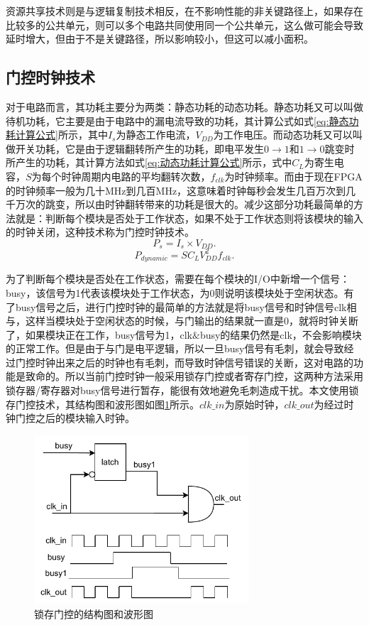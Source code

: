   资源共享技术则是与逻辑复制技术相反，在不影响性能的非关键路径上，如果存在比较多的公共单元，则可以多个电路共同使用同一个公共单元，这么做可能会导致延时增大，但由于不是关键路径，所以影响较小，但这可以减小面积。

\subsection{门控时钟技术}
对于电路而言，其功耗主要分为两类：静态功耗的动态功耗。静态功耗又可以叫做待机功耗，它主要是由于电路中的漏电流导致的功耗，其计算公式如式\eqref{eq:静态功耗计算公式}所示，其中$I_s$为静态工作电流，$V_{DD}$为工作电压。而动态功耗又可以叫做开关功耗，它是由于逻辑翻转所产生的功耗，即电平发生$0\rightarrow1$和$1\rightarrow0$跳变时所产生的功耗，其计算方法如式\eqref{eq:动态功耗计算公式}所示，式中$C_L$为寄生电容，$S$为每个时钟周期内电路的平均翻转次数，$f_{clk}$为时钟频率。而由于现在FPGA的时钟频率一般为几十MHz到几百MHz，这意味着时钟每秒会发生几百万次到几千万次的跳变，所以由时钟翻转带来的功耗是很大的。减少这部分功耗最简单的方法就是：判断每个模块是否处于工作状态，如果不处于工作状态则将该模块的输入的时钟关闭，这种技术称为门控时钟技术。
\begin{equation}\label{eq:静态功耗计算公式}
    P_s = I_s \times V_{DD}.
    \end{equation}
\begin{equation}\label{eq:动态功耗计算公式}
    P_{dynamic}=SC_LV^2_{DD}f_{clk}.
    \end{equation}


为了判断每个模块是否处在工作状态，需要在每个模块的I/O中新增一个信号：busy，该信号为1代表该模块处于工作状态，为0则说明该模块处于空闲状态。有了busy信号之后，进行门控时钟的最简单的方法就是将busy信号和时钟信号clk相与，这样当模块处于空闲状态的时候，与门输出的结果就一直是0，就将时钟关断了，如果模块正在工作，busy信号为1，clk$\&$busy的结果仍然是clk，不会影响模块的正常工作。但是由于与门是电平逻辑，所以一旦busy信号有毛刺，就会导致经过门控时钟出来之后的时钟也有毛刺，而导致时钟信号错误的关断，这对电路的功能是致命的。所以当前门控时钟一般采用锁存门控或者寄存门控，这两种方法采用锁存器/寄存器对busy信号进行暂存，能很有效地避免毛刺造成干扰。本文使用锁存门控技术，其结构图和波形图如图\ref{fig:锁存门控的结构图和波形图}所示。$clk\_in$为原始时钟，$clk\_out$为经过时钟门控之后的模块输入时钟。
\begin{figure}[htb]
    \centering
    \includegraphics[width=8cm]{fig/5-fig/锁存门控的结构图和波形图.drawio.pdf}
    \caption{锁存门控的结构图和波形图}
    \label{fig:锁存门控的结构图和波形图}
\end{figure}

